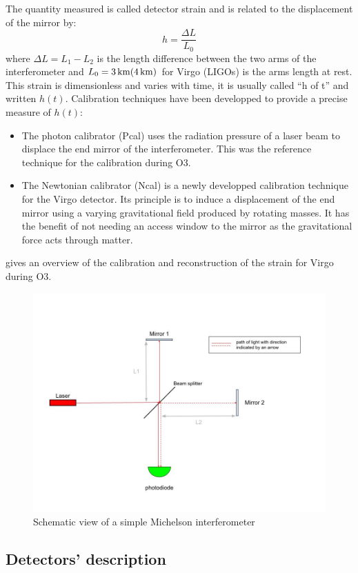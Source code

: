 The quantity measured is called detector strain and is related to the displacement of the mirror by:
\begin{equation}
  h = \frac{\Delta L}{L_0}
\end{equation}
where $\Delta L = L_1-L_2$ is the length difference between the two arms of the interferometer and $L_0 = \textrm{\SI{3}{km}} (\textrm{\SI{4}{km}})$ for Virgo (LIGOs) is the arms length at rest.
This strain is dimensionless and varies with time, it is usually called ``h of t'' and written $h(t)$.
Calibration techniques have been developped to provide a precise measure of $h(t)$:
\begin{itemize}
\item The photon calibrator \cite{pcal} (Pcal) uses the radiation pressure of a laser beam to displace the end mirror of the interferometer.
  This was the reference technique for the calibration during O3.
\item The Newtonian calibrator \cite{ncal1,ncal2} (Ncal) is a newly developped calibration technique for the Virgo detector.
  Its principle is to induce a displacement of the end mirror using a varying gravitational field produced by rotating masses.
  It has the benefit of not needing an access window to the mirror as the gravitational force acts through matter.
\end{itemize}
\cite{strain_reconstruction} gives an overview of the calibration and reconstruction of the strain for Virgo during O3.
%
\begin{figure}
  \centering
  \includegraphics[width=0.5\linewidth]{sectionDetection/michelson.jpg}
  \caption{Schematic view of a simple Michelson interferometer}
  \label{fig:michelson}
\end{figure}


\subsection{Detectors' description}
\label{sec:detector}

